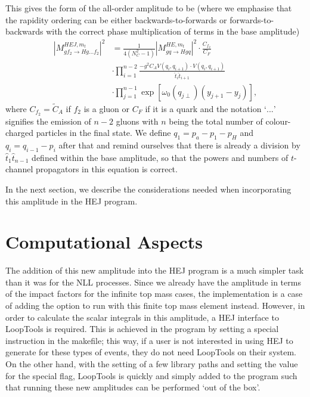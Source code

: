 This gives the form of the all-order amplitude to be (where we emphasise that the rapidity ordering can be either backwards-to-forwards or forwards-to-backwards with the correct phase multiplication of terms in the base amplitude)
\begin{equation}
\begin{split}
|M_{gf_2 \to Hg...f_2}^{HEJ,m_t}|^2 &= \frac{1}{4(N_C^2-1)}|M_{gq \to Hgq}^{HE, m_t}|^2 \cdot \frac{C_{f_2}}{C_F} \\
&\cdot \prod_{i=1}^{n-2} \frac{-g^2 C_A V(q_{i}, q_{i+1}) \cdot V(q_{i}, q_{i+1})}{\hat{t}_{i} \hat{t}_{i+1}}  \\
& \cdot\prod_{j =1}^{n-1} \exp \left[ \omega_0(q_{j \perp})(y_{j+1} - y_j) \right],
\end{split}
\end{equation}
where $C_{f_2} = \tilde{C}_A$ if $f_2$ is a gluon or $C_F$ if it is a quark and the notation `$...$' signifies the emission of $n-2$ gluons with $n$ being the total number of colour-charged particles in the final state. We define $q_1 = p_a - p_1 -p_H$ and $q_i = q_{i-1} - p_i$ after that and remind ourselves that there is already a division by $\hat{t}_1 \hat{t}_{n-1}$ defined within the base amplitude, so that the powers and numbers of $t$-channel propagators in this equation is correct. 

In the next section, we describe the considerations needed when incorporating this amplitude in the HEJ program. 

\section{Computational Aspects}

The addition of this new amplitude into the HEJ program is a much simpler task than it was for the NLL processes. Since we already have the amplitude in terms of the impact factors for the infinite top mass cases, the implementation is a case of adding the option to run with this finite top mass element instead. However, in order to calculate the scalar integrals in this amplitude, a HEJ interface to LoopTools is required. This is achieved in the program by setting a special instruction in the makefile; this way, if a user is not interested in using HEJ to generate for these types of events, they do not need LoopTools on their system. On the other hand, with the setting of a few library paths and setting the value for the special flag, LoopTools is quickly and simply added to the program such that running these new amplitudes can be performed `out of the box'. 


